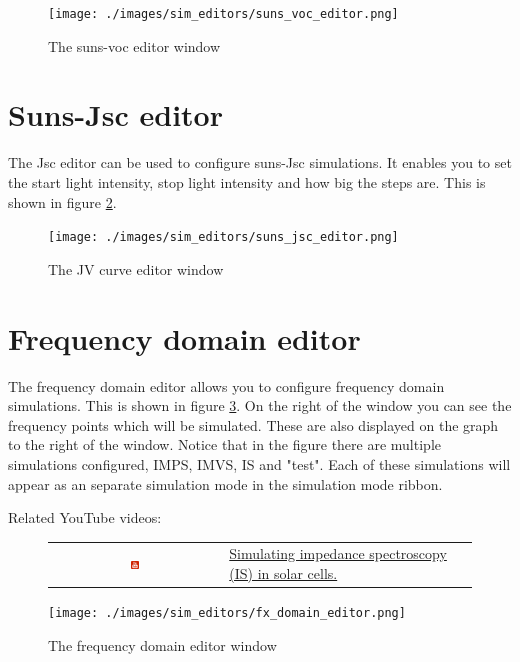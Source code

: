 \begin{figure}[H]
\centering
\texttt{[image: ./images/sim\_editors/suns\_voc\_editor.png]}
\caption{The suns-voc editor window}
\label{fig:sunsvoceditor}
\end{figure}


\section{Suns-Jsc editor}
The Jsc editor can be used to configure suns-Jsc simulations. It enables you to set the start light intensity, stop light intensity and how big the steps are. This is shown in figure \ref{fig:sunsjsceditor}.

\begin{figure}[H]
\centering
\texttt{[image: ./images/sim\_editors/suns\_jsc\_editor.png]}
\caption{The JV curve editor window}
\label{fig:sunsjsceditor}
\end{figure}


\section{Frequency domain editor}
The frequency domain editor allows you to configure frequency domain simulations. This is shown in figure \ref{fig:fxdomaineditor}. On the right of the window you can see the frequency points which will be simulated. These are also displayed on the graph to the right of the window.  Notice that in the figure there are multiple simulations configured, IMPS, IMVS, IS and "test".  Each of these simulations will appear as an separate simulation mode in the simulation mode ribbon.

Related YouTube videos:
\begin{figure}[H]

\begin{tabular}{ c l }

\includegraphics[width=0.05\textwidth]{./images/youtube.png}

&
\href{https://www.youtube.com/watch?v=NJAsZeiB5FU}{Simulating impedance spectroscopy (IS) in solar cells.}

\end{tabular}
\end{figure}


\begin{figure}[H]
\centering
\texttt{[image: ./images/sim\_editors/fx\_domain\_editor.png]}
\caption{The frequency domain editor window}
\label{fig:fxdomaineditor}
\end{figure}

